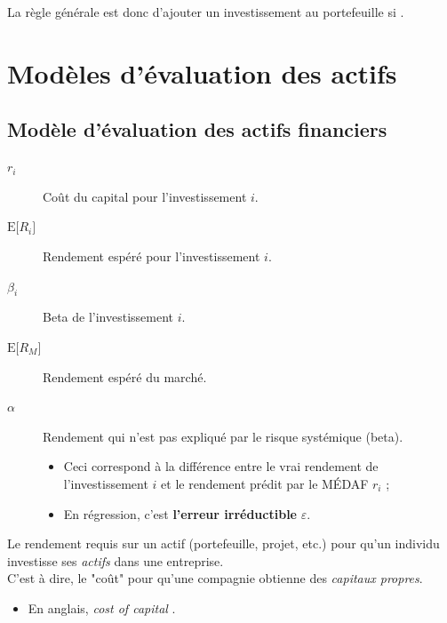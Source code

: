 \documentclass[10pt, french]{article}
\begin{document}
\begin{multicols*}{2}
La règle générale est donc d'ajouter un investissement au portefeuille si .



\newpage
\section{Modèles d'évaluation des actifs}
\subsection{Modèle d'évaluation des actifs financiers}
\begin{distributions}[Notation]
\begin{description}
	\item[$r_{i}$]	Coût du capital pour l'investissement $i$.
	\item[$\text{E}\lbrack R_{i} \rbrack$]	Rendement espéré pour l'investissement $i$.
	\item[$\beta_{i}$]	Beta de l'investissement $i$.
	\item[$\text{E}\lbrack R_{M} \rbrack$]	Rendement espéré du marché.
	\item[$\alpha$]	Rendement qui n'est pas expliqué par le risque systémique (beta).
		\begin{itemize}
		\item	Ceci correspond à la différence entre le vrai rendement de l'investissement $i$ et le rendement prédit par le MÉDAF $r_{i}$ ;
		\item	En régression, c'est \textbf{l'erreur irréductible} $\varepsilon$.
		\end{itemize}
\end{description}
\end{distributions}

\begin{definitionNOHFILLsub}
Le rendement requis sur un actif (portefeuille, projet, etc.) pour qu'un individu investisse ses \textit{actifs} dans une entreprise.	\\
 C'est à dire, le "coût" pour qu'une compagnie obtienne des \textit{capitaux propres}.

\begin{itemize}
	\item	En anglais, \og \textit{cost of capital} \fg{}.
\end{itemize}


\end{definitionNOHFILLsub}
\end{multicols*}
\end{document}
